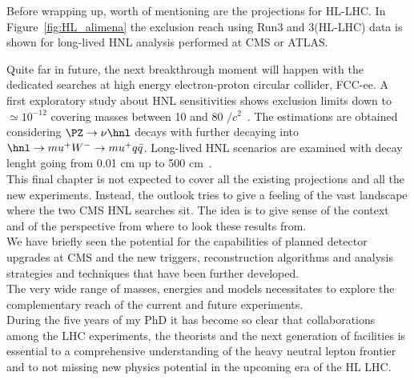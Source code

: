 Before wrapping up, worth of mentioning are the projections for
HL-LHC. In Figure~\ref{fig:HL_alimena} the exclusion reach using Run3
and 3\abinv (HL-LHC) data is shown for long-lived HNL analysis
performed at CMS or ATLAS. 

Quite far in future, the next breakthrough moment will happen with the
dedicated searches at high energy electron-proton circular collider,
FCC-ee. A first exploratory study about HNL sensitivities shows exclusion limits
down to \mixpar $\simeq 10^{-12}$ covering \hnl masses between 10 and
80 \GeV$/c^2$~\cite{blondel2014search}. The estimations are obtained
considering $\PZ \rightarrow \nu \hnl$ decays with \hnl further
decaying into
$\hnl \rightarrow mu^{+} W^{-} \rightarrow mu^{+}
q\bar{q}$. Long-lived HNL scenarios are examined with decay lenght
going from 0.01 cm up to 500 cm~\cite{blondel2014search}.\\


This final chapter is not expected to cover all the existing projections and all the new
experiments. 
Instead, the outlook tries to give a feeling of the vast landscape
where the two CMS HNL searches sit. The idea is to give sense of the
context and of the perspective from where to look these results
from. \\
We have briefly seen the potential for the 
capabilities of planned detector upgrades at CMS and the new triggers,
reconstruction algorithms and analysis strategies and techniques that
have been further developed. \\
The very wide range of masses, energies and models necessitates to
explore the complementary reach of the current and future experiments.\\
During the five years of my PhD it has become so clear that collaborations
among the LHC experiments, the theorists and the next generation of
facilities is essential to a comprehensive
understanding of the heavy neutral lepton frontier and to not missing
new physics potential in the upcoming era of the HL LHC.






















